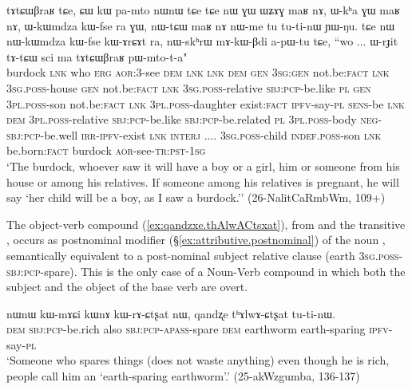\begin{exe}
\ex \label{ex:tAtCWBraR}
\gll tɤtɕɯβraʁ tɕe, ɕɯ kɯ pa-mto nɯnɯ tɕe tɕe nɯ ɣɯ ɯʑɤɣ maʁ nɤ, ɯ-kʰa ɣɯ maʁ nɤ,  ɯ-kɯmdza kɯ-fse ra ɣɯ, nɯ-tɕɯ maʁ nɤ nɯ-me tu tu-ti-nɯ ɲɯ-ŋu. tɕe nɯ nɯ-kɯmdza kɯ-fse kɯ-ɤrɕɤt ra, nɯ-skʰrɯ mɤ-kɯ-βdi a-pɯ-tu tɕe, ``wo ... ɯ-rɟit tɤ-tɕɯ sci ma tɤtɕɯβraʁ pɯ-mto-t-a" \\
burdock \textsc{lnk} who \textsc{erg}  \textsc{aor}:3\flobv{}-see \textsc{dem} \textsc{lnk} \textsc{lnk} \textsc{dem} \textsc{gen} \textsc{3sg}:\textsc{gen} not.be:\textsc{fact} \textsc{lnk} \textsc{3sg}.\textsc{poss}-house \textsc{gen} not.be:\textsc{fact} \textsc{lnk}  \textsc{3sg}.\textsc{poss}-relative \textsc{sbj}:\textsc{pcp}-be.like \textsc{pl} \textsc{gen} \textsc{3pl}.\textsc{poss}-son not.be:\textsc{fact} \textsc{lnk} \textsc{3pl}.\textsc{poss}-daughter exist:\textsc{fact} \textsc{ipfv}-say-\textsc{pl} \textsc{sens}-be \textsc{lnk} \textsc{dem} \textsc{3pl}.\textsc{poss}-relative  \textsc{sbj}:\textsc{pcp}-be.like  \textsc{sbj}:\textsc{pcp}-be.related \textsc{pl}  \textsc{3pl}.\textsc{poss}-body  \textsc{neg}-\textsc{sbj}:\textsc{pcp}-be.well \textsc{irr}-\textsc{ipfv}-exist \textsc{lnk} \textsc{interj} .... \textsc{3sg}.\textsc{poss}-child \textsc{indef}.\textsc{poss}-son \textsc{lnk} be.born:\textsc{fact} burdock \textsc{aor}-see-\textsc{tr}:\textsc{pst}-\textsc{1sg} \\
\glt `The burdock, whoever saw it will have a boy or a girl, him or someone from his house or among his relatives. If someone among his relatives is pregnant, he will say `her child will be a boy, as I saw a burdock.'' (26-NalitCaRmbWm, 109+)
\end{exe}

The object-verb compound  (\ref{ex:qandzxe.thAlwACtsxat}), from  and the transitive , occurs as postnominal modifier (§\ref{ex:attributive.postnominal}) of the noun , semantically equivalent to a post-nominal subject relative clause  (earth \textsc{3sg}.\textsc{poss}-\textsc{sbj}:\textsc{pcp}-spare). This is the only case of a Noun-Verb compound in which both the subject and the object of the base verb are overt.

\begin{exe}
\ex \label{ex:qandzxe.thAlwACtsxat}
\gll nɯnɯ kɯ-mɤɕi kɯnɤ kɯ-rɤ-ɕtʂat nɯ, qandʐe tʰɤlwɤ-ɕtʂat tu-ti-nɯ. \\
\textsc{dem} \textsc{sbj}:\textsc{pcp}-be.rich also \textsc{sbj}:\textsc{pcp}-\textsc{apass}-spare \textsc{dem} earthworm earth-sparing \textsc{ipfv}-say-\textsc{pl} \\
\glt `Someone who spares things (does not waste anything) even though he is rich, people call him an `earth-sparing earthworm'.' (25-akWzgumba, 136-137)
\end{exe}

